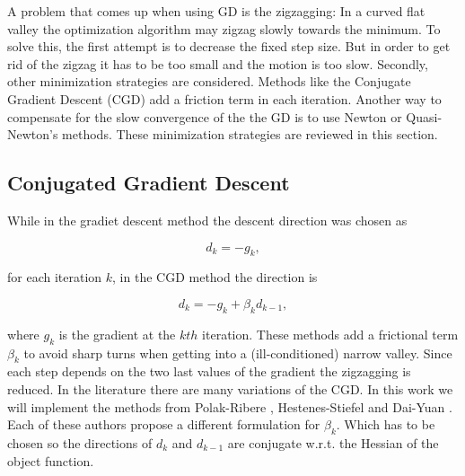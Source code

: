 \label{subsubsec:zigzag}


A problem that comes up when using GD is the zigzagging: In a curved flat valley the optimization algorithm may zigzag slowly towards the minimum. 
To solve this, the first attempt is to decrease the fixed step size. But in order to get rid of the zigzag it has to be too small and the motion is too slow.
Secondly, other minimization strategies are considered. Methods like the Conjugate Gradient Descent (CGD) add a friction term in each iteration. Another way to compensate for the slow convergence of the the GD is to use Newton or Quasi-Newton's methods. These minimization strategies are reviewed in this section.



\subsection{Conjugated Gradient Descent}
\label{subsec:CJD}



While in the gradiet descent method the descent direction was chosen as 

\begin{equation}
d_k = -g_k ,
\end{equation} 

for each iteration $k$, in the CGD method the direction is

\begin{equation}
d_k = -g_k + \beta_k d_{k-1},
\end{equation}

where $g_k$ is the gradient at the $kth$ iteration. These methods add a frictional term $\beta_k$ to avoid sharp turns when getting into a (ill-conditioned) narrow valley. Since each step depends on the two last values of the gradient the zigzagging is reduced. 
%
In the literature there are many variations of the CGD. In this work we will implement  the methods from Polak-Ribere \cite{polak},  Hestenes-Stiefel \cite{hestenes} and Dai-Yuan \cite{dai}. Each of these authors propose a different formulation for $\beta_k$. Which has to be chosen so the directions of $d_{k}$ and $d_{k-1}$ are conjugate w.r.t. the Hessian of the object function.


